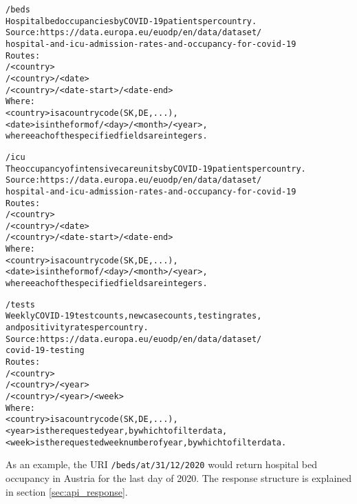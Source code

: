\documentclass[pdftex, 11pt, a4paper]{article}
\newcommand{\code}{\texttt}
\begin{document}
    \begin{alltt}
    /beds
        Hospital bed occupancies by COVID-19 patients per country.
        Source: https://data.europa.eu/euodp/en/data/dataset/
                    hospital-and-icu-admission-rates-and-occupancy-for-covid-19
        Routes:
            /<country>
            /<country>/<date>
            /<country>/<date-start>/<date-end>
        Where:
            <country>   is a country code (SK, DE, ...),
            <date>      is in the form of /<day>/<month>/<year>,
                        where each of the specified fields are integers.

    /icu
        The occupancy of intensive care units by COVID-19 patients per country.
        Source: https://data.europa.eu/euodp/en/data/dataset/
                    hospital-and-icu-admission-rates-and-occupancy-for-covid-19
        Routes:
            /<country>
            /<country>/<date>
            /<country>/<date-start>/<date-end>
        Where:
            <country>   is a country code (SK, DE, ...),
            <date>      is in the form of /<day>/<month>/<year>,
                        where each of the specified fields are integers.

    /tests
        Weekly COVID-19 test counts, new case counts, testing rates,
        and positivity rates per country.
        Source: https://data.europa.eu/euodp/en/data/dataset/
                    covid-19-testing
        Routes:
            /<country>
            /<country>/<year>
            /<country>/<year>/<week>
        Where:
            <country>   is a country code (SK, DE, ...),
            <year>      is the requested year, by which to filter data,
            <week>      is the requested week number of year, by which to filter data.
    \end{alltt}

    As an example, the URI \code{/beds/at/31/12/2020} would return hospital bed occupancy
    in Austria for the last day of 2020. The response structure is explained in
    section \ref{sec:api_response}.
\end{document}
